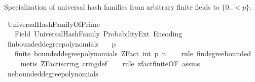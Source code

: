 %
\begin{isabellebody}%
%
%
\isadelimdocument
%
\endisadelimdocument
%
\isatagdocument
%
\isamarkuptrue%
%
\endisatagdocument
{\isafolddocument}%
%
\isadelimdocument
%
\endisadelimdocument
%
\begin{isamarkuptext}%
Specialization of universal hash families from arbitrary finite 
  fields to $\{0..<p\}$.%
\end{isamarkuptext}\isamarkuptrue%
%
\isadelimtheory
%
\endisadelimtheory
%
\isatagtheory
{}\isamarkupfalse%
\ UniversalHashFamilyOfPrime\isanewline
\ \ \ Field\ UniversalHashFamily\ Probability{\isacharunderscore}{\kern0pt}Ext\ Encoding\isanewline
{}%
\endisatagtheory
{\isafoldtheory}%
%
\isadelimtheory
%
\endisadelimtheory
\isanewline
\isanewline
{}\isamarkupfalse%
\ fin{\isacharunderscore}{\kern0pt}bounded{\isacharunderscore}{\kern0pt}degree{\isacharunderscore}{\kern0pt}polynomials{\isacharcolon}{\kern0pt}\isanewline
\ \ \ {\isachardoublequoteopen}p\ {\isachargreater}{\kern0pt}\ {}{\isachardoublequoteclose}\isanewline
\ \ \ {\isachardoublequoteopen}finite\ {\isacharparenleft}{\kern0pt}bounded{\isacharunderscore}{\kern0pt}degree{\isacharunderscore}{\kern0pt}polynomials\ {\isacharparenleft}{\kern0pt}ZFact\ {\isacharparenleft}{\kern0pt}int\ p{\isacharparenright}{\kern0pt}{\isacharparenright}{\kern0pt}\ n{\isacharparenright}{\kern0pt}{\isachardoublequoteclose}\isanewline
%
\isadelimproof
\ \ %
\endisadelimproof
%
\isatagproof
{}\isamarkupfalse%
\ {\isacharparenleft}{\kern0pt}rule\ fin{\isacharunderscore}{\kern0pt}degree{\isacharunderscore}{\kern0pt}bounded{\isacharparenright}{\kern0pt}\isanewline
\ \ \ \isamarkupfalse%
\ {\isacharparenleft}{\kern0pt}metis\ ZFact{\isacharunderscore}{\kern0pt}is{\isacharunderscore}{\kern0pt}cring\ cring{\isacharunderscore}{\kern0pt}def{\isacharparenright}{\kern0pt}\isanewline
\ \ \isamarkupfalse%
\ {\isacharparenleft}{\kern0pt}rule\ zfact{\isacharunderscore}{\kern0pt}finite{\isacharbrackleft}{\kern0pt}OF\ assms{\isacharbrackright}{\kern0pt}{\isacharparenright}{\kern0pt}%
\endisatagproof
{\isafoldproof}%
%
\isadelimproof
\isanewline
%
\endisadelimproof
\isanewline
{}\isamarkupfalse%
\ ne{\isacharunderscore}{\kern0pt}bounded{\isacharunderscore}{\kern0pt}degree{\isacharunderscore}{\kern0pt}polynomials{\isacharcolon}{\kern0pt}\isanewline

\end{isabellebody}
